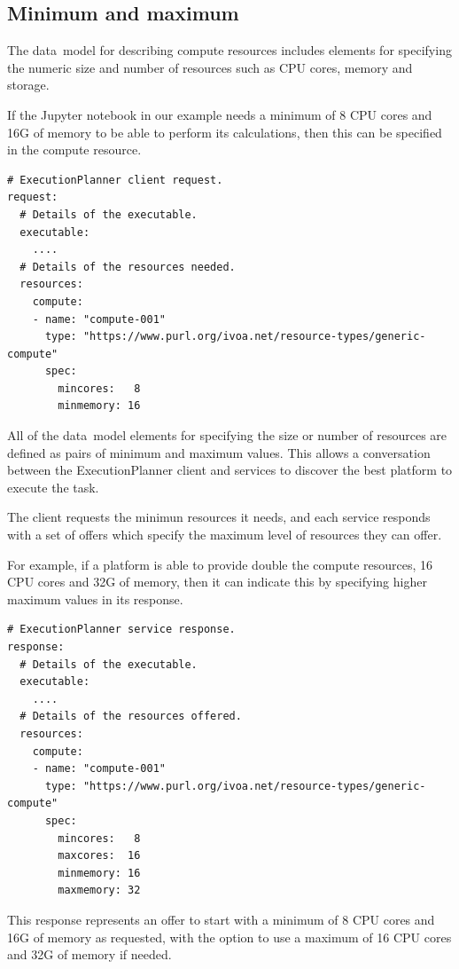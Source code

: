 \documentclass[11pt,a4paper]{ivoa}
\newcommand{\datamodel} {data~model}
\newcommand{\execplanner} {ExecutionPlanner}
\newcommand{\jupyternotebook} {Jupyter notebook}
\newcommand{\cpu} {CPU}
\begin{document}
\subsection{Minimum and maximum}
\label{minandmax}

The \datamodel{} for describing compute resources includes elements for specifying the numeric size
and number of resources such as \cpu{} cores, memory and storage.

If the \jupyternotebook{} in our example needs a minimum of 8 \cpu{} cores and 16G of memory
to be able to perform its calculations, then this can be specified in the compute resource.

\begin{lstlisting}[]
# ExecutionPlanner client request.
request:
  # Details of the executable.
  executable:
    ....
  # Details of the resources needed.
  resources:
    compute:
    - name: "compute-001"
      type: "https://www.purl.org/ivoa.net/resource-types/generic-compute"
      spec:
        mincores:   8
        minmemory: 16
\end{lstlisting}

All of the \datamodel{} elements for specifying the size or number of resources are defined
as pairs of minimum and maximum values.
This allows a conversation between the \execplanner{} client and services
to discover the best platform to execute the task.

The client requests the minimun resources it needs,
and each service responds with a set of offers which specify the maximum
level of resources they can offer.

For example, if a platform is able to provide double the compute resources,
16 \cpu{} cores and 32G of memory,
then it can indicate this by specifying higher maximum values in its response.

\begin{lstlisting}[]
# ExecutionPlanner service response.
response:
  # Details of the executable.
  executable:
    ....
  # Details of the resources offered.
  resources:
    compute:
    - name: "compute-001"
      type: "https://www.purl.org/ivoa.net/resource-types/generic-compute"
      spec:
        mincores:   8
        maxcores:  16
        minmemory: 16
        maxmemory: 32
\end{lstlisting}

This response represents an offer to start with a minimum of 8 \cpu{} cores and 16G of memory
as requested, with the option to use a maximum of 16 \cpu{} cores and 32G of memory if needed.
\end{document}
